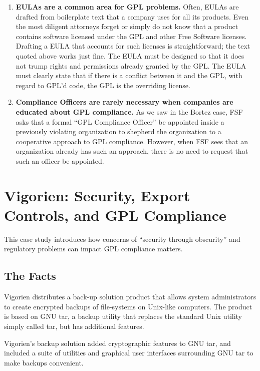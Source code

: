 \begin{enumerate}
\item {\bf EULAs are a common area for GPL problems.}  Often, EULAs
  are drafted from boilerplate text that a company uses for all its
  products. Even the most diligent attorneys forget or simply do not
  know that a product contains software licensed under the GPL and other
  Free Software licenses. Drafting a EULA that accounts for such
  licenses is straightforward; the text quoted above works just fine.
  The EULA must be designed so that it does not trump rights and
  permissions already granted by the GPL\@. The EULA must clearly state
  that if there is a conflict between it and the GPL, with regard to GPL'd
  code, the GPL is the overriding license.

\item {\bf Compliance Officers are rarely necessary when companies are
  educated about GPL compliance.}  As we saw in the Bortez case, FSF asks
  that a formal ``GPL Compliance Officer'' be appointed inside a
  previously violating organization to shepherd the organization to a
  cooperative approach to GPL compliance. However, when FSF
  sees that an organization already has such an approach, there is no
  need to request that such an officer be appointed.

\end{enumerate}


\chapter{Vigorien: Security, Export Controls, and GPL Compliance}

This case study introduces how concerns of ``security through obscurity''
and regulatory problems can impact GPL compliance matters.

\section{The Facts}

Vigorien distributes a back-up solution product that allows system
administrators to create encrypted backups of file-systems on
Unix-like computers. The product is based on GNU tar, a backup utility
that replaces the standard Unix utility simply called tar, but has
additional features.

Vigorien's backup solution added cryptographic features to GNU tar, and
included a suite of utilities and graphical user interfaces surrounding
GNU tar to make backups convenient.


